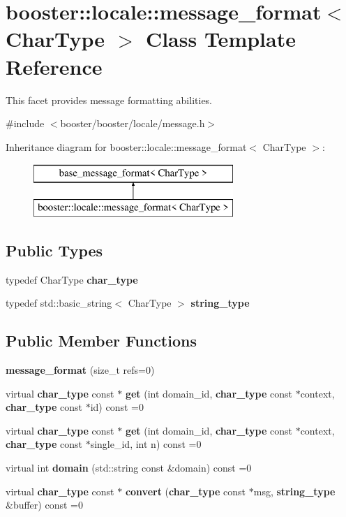 \section{booster\+:\+:locale\+:\+:message\+\_\+format$<$ Char\+Type $>$ Class Template Reference}
\label{classbooster_1_1locale_1_1message__format}


This facet provides message formatting abilities.  




{\ttfamily \#include $<$booster/booster/locale/message.\+h$>$}

Inheritance diagram for booster\+:\+:locale\+:\+:message\+\_\+format$<$ Char\+Type $>$\+:\begin{figure}[H]
\begin{center}
\leavevmode
\includegraphics[height=2.000000cm]{classbooster_1_1locale_1_1message__format}
\end{center}
\end{figure}
\subsection*{Public Types}
\begin{DoxyCompactItemize}
\item 
typedef Char\+Type {\bf char\+\_\+type}
\item 
typedef std\+::basic\+\_\+string$<$ Char\+Type $>$ {\bf string\+\_\+type}
\end{DoxyCompactItemize}
\subsection*{Public Member Functions}
\begin{DoxyCompactItemize}
\item 
{\bf message\+\_\+format} (size\+\_\+t refs=0)
\item 
virtual {\bf char\+\_\+type} const $\ast$ {\bf get} (int domain\+\_\+id, {\bf char\+\_\+type} const $\ast$context, {\bf char\+\_\+type} const $\ast$id) const =0
\item 
virtual {\bf char\+\_\+type} const $\ast$ {\bf get} (int domain\+\_\+id, {\bf char\+\_\+type} const $\ast$context, {\bf char\+\_\+type} const $\ast$single\+\_\+id, int n) const =0
\item 
virtual int {\bf domain} (std\+::string const \&domain) const =0
\item 
virtual {\bf char\+\_\+type} const $\ast$ {\bf convert} ({\bf char\+\_\+type} const $\ast$msg, {\bf string\+\_\+type} \&buffer) const =0
\end{DoxyCompactItemize}


